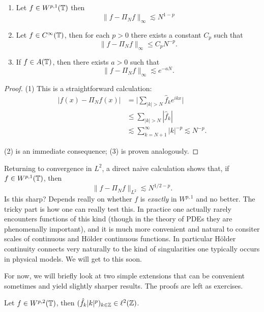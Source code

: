 \begin{theorem} \label{th:trig:convergence_max}
  \begin{enumerate} \ilist
    \item Let $f \in W^{p,1}(\mathbb{T})$ then
    \[
        \|f - \Pi_N f \|_{\infty} \lesssim N^{1-p}
    \]
    \item Let $f \in C^\infty(\mathbb{T})$, then for each $p > 0$ there exists a
    constant $C_p$ such that
    \[
        \|f - \Pi_N f \|_{\infty} \leq C_p N^{-p}.
    \]
    \item If $f \in A(\mathbb{T})$, then there exists $a > 0$ such that
    \[
         \| f - \Pi_N f \|_{\infty} \lesssim e^{-a N}.
    \]
    \end{enumerate}
  \end{theorem}
\begin{proof}
  (1) This is a straightforward calculation: 
  \begin{align*}
    \big|f(x) - \Pi_N f(x)\big|
    &= 
    \bigg| \sum_{|k| > N} \hat{f}_k e^{i k x} \bigg| 
    \\ &\leq
    \sum_{|k| > N} |\hat{f}_k|
    \\ &\lesssim
    \sum_{k = N+1}^\infty |k|^{-p} \lesssim N^{-p}.
  \end{align*}

  (2) is an immediate consequence; (3) is proven analogously. 
\end{proof}

Returning to convergence in $L^2$, a direct naive calculation shows that, if $f \in W^{p,1}(\mathbb{T})$, then
\[
    \|f - \Pi_N f \|_{L^2} \lesssim N^{1/2-p}.
\]
Is this sharp? Depends really on whether $f$ is {\it exactly} in $W^{p,1}$ and no better. The tricky part is how one can really test this. In practice one actually rarely encounters functions of this kind (though in the theory of PDEs they are phenomenally important), and it is much more convenient and natural to consiter scales of continuous and H\"{o}lder continuous functions. In particular H\"{o}lder continuity connects very naturally to the kind of singularities one typically occurs in physical models. We will get to this soon. 

For now, we will briefly look at two simple extensions that can be convenient sometimes and yield slightly sharper results. The proofs are left as exercises. 

  
\begin{lemma} \label{th:trig:fCp-coeffL2}
  Let $f \in W^{p,2}(\mathbb{T})$, then $(\hat{f}_k |k|^p)_{k \in \mathbb{Z}} \in \ell^2(\mathbb{Z})$. 
\end{lemma}


